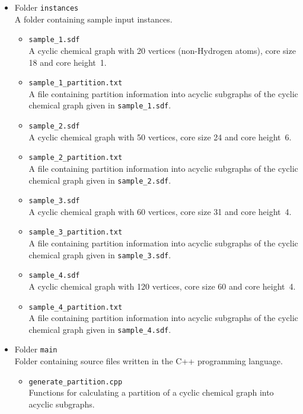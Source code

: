 \documentclass[11pt,titlepage,dvipdfmx,twoside]{book}
\begin{document}
\begin{itemize}
\begin{itemize}
	\item Folder {\tt instances}\\
		A folder containing sample input instances.
		\begin{itemize}
			\item{\tt sample\_1.sdf}\\
			  A cyclic chemical graph with 20 vertices (non-Hydrogen atoms),
			    core size 18 and core height~1.
			\item{\tt sample\_1\_partition.txt}\\
			  A file containing partition information into acyclic subgraphs 
				of the cyclic chemical graph given in {\tt sample\_1.sdf}.
			\item{\tt sample\_2.sdf}\\
			  A cyclic chemical graph with 50 vertices, 
			    core size 24 and core height~6.
			\item{\tt sample\_2\_partition.txt}\\
			  A file containing partition information into acyclic subgraphs 
				of the cyclic chemical graph given in {\tt sample\_2.sdf}.
			\item{\tt sample\_3.sdf}\\
			  A cyclic chemical graph with 60 vertices, 
			    core size 31 and core height~4.
			\item{\tt sample\_3\_partition.txt}\\
			  A file containing partition information into acyclic subgraphs 
				of the cyclic chemical graph given in {\tt sample\_3.sdf}.
			\item{\tt sample\_4.sdf}\\
			  A cyclic chemical graph with 120 vertices, 
			    core size 60 and core height~4.
			\item{\tt sample\_4\_partition.txt}\\
			  A file containing partition information into acyclic subgraphs 
				of the cyclic chemical graph given in {\tt sample\_4.sdf}.
		\end{itemize}
    \item Folder {\tt main}\\
	    Folder containing source files written in the C++ programming language.
	    \begin{itemize}
		    \item{ \tt generate\_partition.cpp}\\
			    Functions for calculating a partition of a cyclic chemical graph into
			    acyclic subgraphs.
			    

\end{itemize}
\end{itemize}
\end{itemize}
\end{document}
